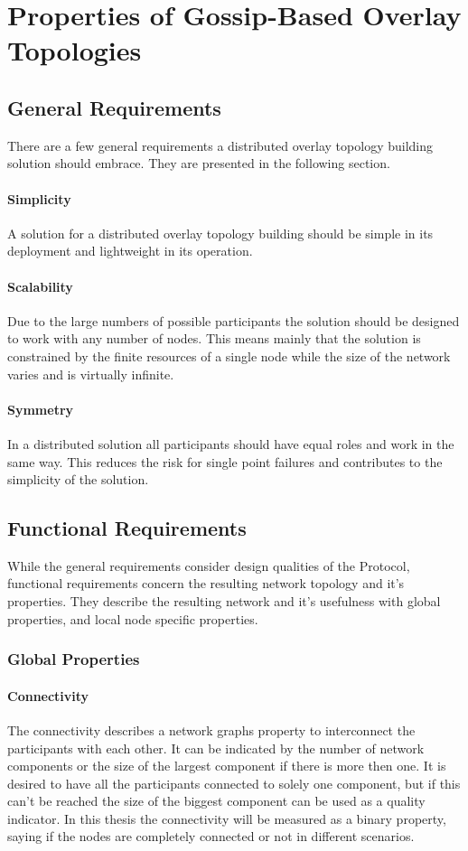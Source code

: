 \chapter{Properties of Gossip-Based Overlay Topologies} 
\label{chap:properties}

\section{General Requirements}
There are a few general requirements a distributed overlay topology building
solution should embrace. They are presented in the following section.
\subsubsection{Simplicity}
A solution for a distributed overlay topology building should be simple in its
deployment and lightweight in its operation. 
\subsubsection{Scalability}
Due to the large numbers of possible participants the solution should be
designed to work with any number of nodes. This means mainly that the solution
is constrained by the finite resources of a single node while the size of the
network varies and is virtually infinite.

\subsubsection{Symmetry}
In a distributed solution all participants should have equal roles and work in
the same way. This reduces the risk for single point failures and contributes to
the simplicity of the solution.

\section{Functional Requirements}
While the general requirements consider design qualities of the Protocol,
functional requirements concern the resulting network topology and it's
properties. They describe the resulting network and it’s usefulness with global
properties, and local node specific properties.

\subsection{Global Properties}

\subsubsection{Connectivity}
The connectivity describes a network graphs property to interconnect the
participants with each other. It can be indicated by the number of network
components or the size of the largest component if there is more then one. It is
desired to have all the participants connected to solely one component, but if
this can't be reached the size of the biggest component can be used as a quality
indicator. In this thesis the connectivity will be measured as a binary
property, saying if the nodes are completely connected or not in different
scenarios.
